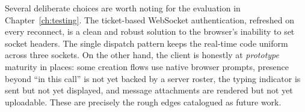 Several deliberate choices are worth noting for the evaluation in
Chapter~\ref{ch:testing}. The ticket-based WebSocket authentication, refreshed on
every reconnect, is a clean and robust solution to the browser's inability to set
socket headers. The single  dispatch pattern keeps the
real-time code uniform across three sockets. On the other hand, the client is
honestly at \emph{prototype} maturity in places: some creation flows use native
browser prompts, presence beyond ``in this call'' is not yet backed by a server
roster, the typing indicator is sent but not yet displayed, and message
attachments are rendered but not yet uploadable. These are precisely the rough
edges catalogued as future work.
